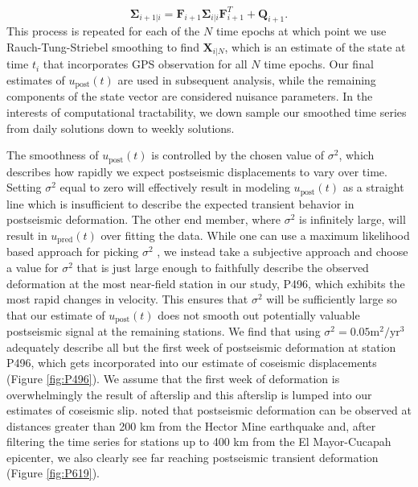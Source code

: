 \documentclass[draft,linenumbers]{AGUJournal}
\begin{document}
\begin{equation}
  \mathbf{\Sigma}_{i+1|i} = \mathbf{F}_{i+1}\mathbf{\Sigma}_{i|i}\mathbf{F}^T_{i+1} + \mathbf{Q}_{i+1}.
\end{equation}
This process is repeated for each of the $N$ time epochs at which point we use Rauch-Tung-Striebel smoothing \citep{Rauch1965} to find $\mathbf{X}_{i|N}$, which is an estimate of the state at time $t_i$ that incorporates GPS observation for all $N$ time epochs.  Our final estimates of $u_\mathrm{post}(t)$ are used in subsequent analysis, while the remaining components of the state vector are considered nuisance parameters. In the interests of computational tractability, we down sample our smoothed time series from daily solutions down to weekly solutions.

The smoothness of $u_\mathrm{post}(t)$ is controlled by the chosen value of $\sigma^2$, which describes how rapidly we expect postseismic displacements to vary over time.  Setting $\sigma^2$ equal to zero will effectively result in modeling $u_\mathrm{post}(t)$ as a straight line which is insufficient to describe the expected transient behavior in postseismic deformation. The other end member, where $\sigma^2$ is infinitely large, will result in $u_\mathrm{pred}(t)$ over fitting the data. While one can use a maximum likelihood based approach for picking $\sigma^2$ \citep[e.g.][]{Segall1997}, we instead take a subjective approach and choose a value for $\sigma^2$ that is just large enough to faithfully describe the observed deformation at the most near-field station in our study, P496, which exhibits the most rapid changes in velocity. This ensures that $\sigma^2$ will be sufficiently large so that our estimate of $u_\mathrm{post}(t)$ does not smooth out potentially valuable postseismic signal at the remaining stations. We find that using $\sigma^2 = 0.05 \mathrm{m}^2 / \mathrm{yr}^3$ adequately describe all but the first week of postseismic deformation at station P496, which gets incorporated into our estimate of coseismic displacements (Figure \ref{fig:P496}).  We assume that the first week of deformation is overwhelmingly the result of afterslip and this afterslip is lumped into our estimates of coseismic slip. \citet{Freed2007a} noted that postseismic deformation can be observed at distances greater than 200 km from the Hector Mine earthquake and, after filtering the time series for stations up to 400 km from the El Mayor-Cucapah epicenter, we also clearly see far reaching postseismic transient deformation (Figure \ref{fig:P619}).      
\end{document}
